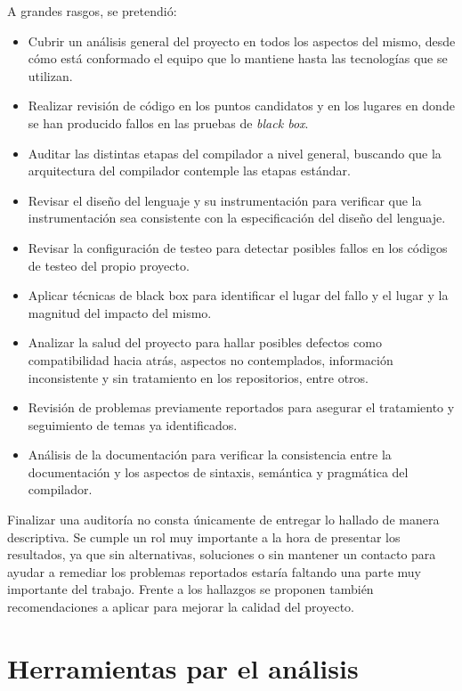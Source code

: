 A grandes rasgos, se pretendió:
\begin{itemize}
    \item Cubrir un análisis general del proyecto en todos los aspectos del mismo, desde cómo está conformado el equipo que lo mantiene hasta las tecnologías que se utilizan.
    \item Realizar revisión de código en los puntos candidatos y en los lugares en donde se han  producido fallos en las pruebas de \textit{black box}.
    \item Auditar las distintas etapas del compilador a nivel general, buscando que la arquitectura del compilador contemple las etapas estándar.
    \item Revisar el diseño del lenguaje y su instrumentación para verificar que la instrumentación sea consistente con la especificación del diseño del lenguaje.
    \item Revisar la configuración de testeo para detectar posibles fallos en los códigos de testeo del propio proyecto.
    \item Aplicar técnicas de black box para identificar el lugar del fallo y el lugar y la magnitud del impacto del mismo.
    \item Analizar la salud del proyecto para hallar posibles defectos como compatibilidad hacia atrás, aspectos no contemplados, información inconsistente y sin tratamiento en los repositorios, entre otros.
    \item Revisión de problemas previamente reportados para asegurar el tratamiento y seguimiento de temas ya identificados.
    \item Análisis de la documentación para verificar la consistencia entre la documentación y los aspectos de sintaxis, semántica y pragmática del compilador.
\end{itemize}
\bigskip

Finalizar una auditoría no consta únicamente de entregar lo hallado de manera descriptiva. Se cumple un rol muy importante a la hora de presentar los resultados, ya que sin alternativas, soluciones o sin mantener un contacto para ayudar a remediar los problemas reportados estaría faltando una parte muy importante del trabajo. Frente a los hallazgos se proponen también recomendaciones a aplicar para mejorar la calidad del proyecto.

\section{Herramientas par el análisis}

